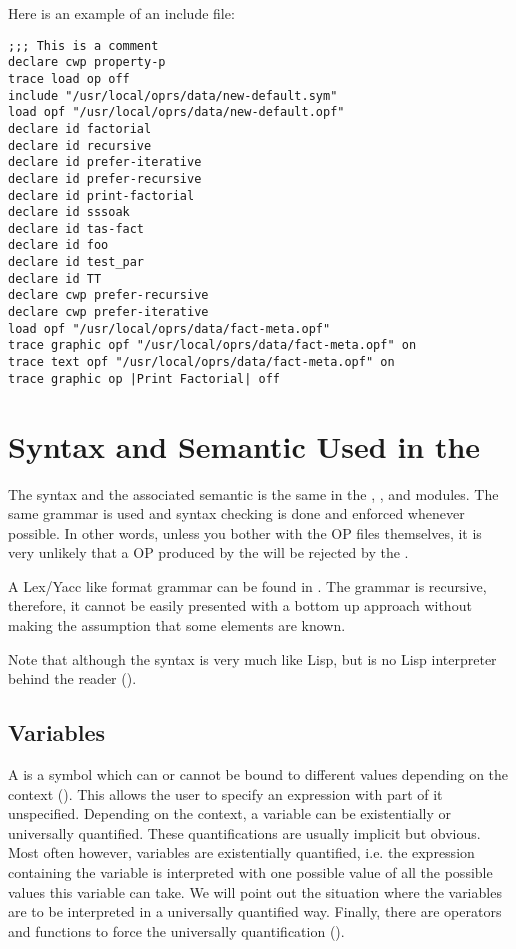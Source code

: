 Here is an example of an include file:

\begin{verbatim}
;;; This is a comment
declare cwp property-p
trace load op off
include "/usr/local/oprs/data/new-default.sym"
load opf "/usr/local/oprs/data/new-default.opf"
declare id factorial
declare id recursive
declare id prefer-iterative
declare id prefer-recursive
declare id print-factorial
declare id sssoak
declare id tas-fact
declare id foo
declare id test_par
declare id TT
declare cwp prefer-recursive
declare cwp prefer-iterative
load opf "/usr/local/oprs/data/fact-meta.opf"
trace graphic opf "/usr/local/oprs/data/fact-meta.opf" on
trace text opf "/usr/local/oprs/data/fact-meta.opf" on
trace graphic op |Print Factorial| off
\end{verbatim}

\chapter{Syntax and Semantic Used in the \COPRSDE{}}

The syntax and the associated semantic is the same in the
\CPK{}, \XPK{}, \OPE{} and \OPRSS{} modules. The same grammar is used and syntax
checking is done and enforced whenever possible. In other words, unless you bother with
the OP files themselves, it is very unlikely that a OP produced by the
\OPE{} will be rejected by the \CPK{}.

A Lex/Yacc like format grammar can be found in . The grammar is recursive, therefore, it cannot be
easily presented with a bottom up approach without making the assumption that
some elements are known.

Note that although the syntax is very much like Lisp, but is no Lisp
interpreter behind the reader ().


\section{Variables}

A  is a symbol which can  or cannot be bound to different
values depending on the context (). This
allows the user to specify an expression with part of it unspecified. Depending on
the context, a variable can be existentially or universally
quantified. These quantifications are usually implicit but obvious. Most often
however, variables are existentially quantified, i.e. the expression containing
the variable is interpreted with one possible value of all the possible values
this variable can take. We will point out the situation where the variables are
to be interpreted in a universally quantified way. Finally, there are operators
and functions to force the universally quantification ().

